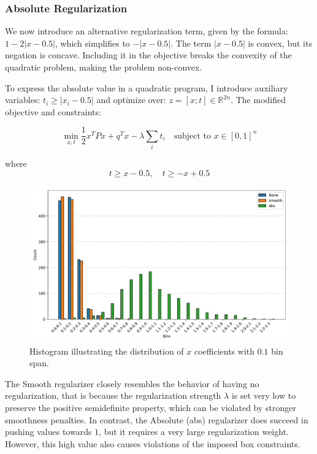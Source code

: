 \subsubsection{Absolute Regularization}

We now introduce an alternative regularization term, given by the formula: \(1-2\left|x-0.5\right|\), which simplifies to \(-\left|x-0.5\right|\). The term \(\left|x-0.5\right|\) is convex, but its negation is concave. Including it in the objective breaks the convexity of the quadratic problem, making the problem non-convex.

To express the absolute value in a quadratic program, I introduce auxiliary variables: \(t_i \geq \left|x_i - 0.5\right|\) and optimize over: \(z = \left[x;t\right] \in \mathbb{R}^{2n}\). The modified objective and constraints:

\begin{equation}
\min_{x, t} \frac{1}{2} x^TPx + q^Tx - \lambda \sum_i{t_i} \quad \text{subject to } x \in [0,1]^n
\end{equation}

where
\[t \geq x - 0.5, \quad t \geq -x + 0.5\]

\begin{figure}[H]
    \centering
    \includegraphics[width=\linewidth]{images/regularization/regularized_x_binned.pdf}
    \caption{Histogram illustrating the distribution of \(x\) coefficients with \(0.1\) bin span.}
    \label{fig:x_binned}
\end{figure}

The Smooth regularizer closely resembles the behavior of having no regularization, that is because the regularization strength \(\lambda\) is set very low to preserve the positive semidefinite property, which can be violated by stronger smoothness penalties. In contrast, the Absolute (abs) regularizer does succeed in pushing values towards \(1\), but it requires a very large regularization weight. However, this high value also causes violations of the imposed box constraints.


